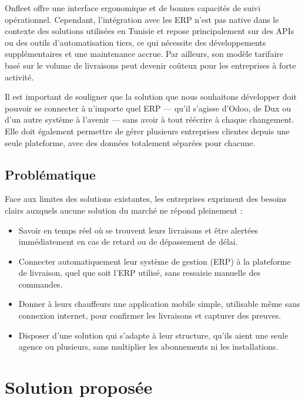 Onfleet offre une interface ergonomique et de bonnes capacités de suivi opérationnel.
Cependant, l'intégration avec les ERP n'est pas native dans le contexte des solutions
utilisées en Tunisie et repose principalement sur des APIs ou des outils d'automatisation
tiers, ce qui nécessite des développements supplémentaires et une maintenance accrue.
Par ailleurs, son modèle tarifaire basé sur le volume de livraisons peut devenir coûteux
pour les entreprises à forte activité.

Il est important de souligner que la solution que nous souhaitons développer doit pouvoir
se connecter à n'importe quel ERP — qu'il s'agisse d'Odoo, de Dux ou d'un autre système
à l'avenir — sans avoir à tout réécrire à chaque changement. Elle doit également permettre
de gérer plusieurs entreprises clientes depuis une seule plateforme, avec des données
totalement séparées pour chacune.

\subsection{Problématique}

Face aux limites des solutions existantes, les entreprises expriment des besoins clairs
auxquels aucune solution du marché ne répond pleinement :

\begin{itemize}
  \item Savoir en temps réel où se trouvent leurs livraisons et être alertées immédiatement
        en cas de retard ou de dépassement de délai.
  \item Connecter automatiquement leur système de gestion (ERP) à la plateforme de
        livraison, quel que soit l'ERP utilisé, sans ressaisie manuelle des commandes.
  \item Donner à leurs chauffeurs une application mobile simple, utilisable même sans
        connexion internet, pour confirmer les livraisons et capturer des preuves.
  \item Disposer d'une solution qui s'adapte à leur structure, qu'ils aient une seule
        agence ou plusieurs, sans multiplier les abonnements ni les installations.
\end{itemize}

\section{Solution proposée}

